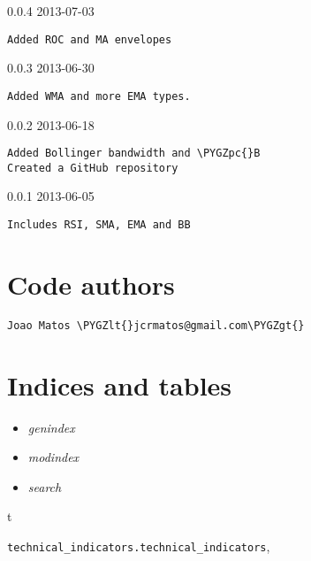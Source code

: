 \documentclass[letterpaper,10pt,english]{sphinxmanual}
\def\PYGZlt{\char`\<}
\def\PYGZgt{\char`\>}
\def\PYGZpc{\char`\%}
\begin{document}
0.0.4 2013-07-03

\begin{Verbatim}[commandchars=\\\{\}]
Added ROC and MA envelopes
\end{Verbatim}

0.0.3 2013-06-30

\begin{Verbatim}[commandchars=\\\{\}]
Added WMA and more EMA types.
\end{Verbatim}

0.0.2 2013-06-18

\begin{Verbatim}[commandchars=\\\{\}]
Added Bollinger bandwidth and \PYGZpc{}B
Created a GitHub repository
\end{Verbatim}

0.0.1 2013-06-05

\begin{Verbatim}[commandchars=\\\{\}]
Includes RSI, SMA, EMA and BB
\end{Verbatim}


\chapter{Code authors}
\label{codeauthors:code-authors}\label{codeauthors::doc}
\begin{Verbatim}[commandchars=\\\{\}]
Joao Matos \PYGZlt{}jcrmatos@gmail.com\PYGZgt{}
\end{Verbatim}


\chapter{Indices and tables}
\label{index:indices-and-tables}\begin{itemize}
\item {} 
\emph{genindex}

\item {} 
\emph{modindex}

\item {} 
\emph{search}

\end{itemize}


\renewcommand{\indexname}{Python Module Index}
\begin{theindex}
\def\bigletter#1{{\Large\sffamily#1}\nopagebreak\vspace{1mm}}
\bigletter{t}
\item {\texttt{technical\_indicators.technical\_indicators}}, \pageref{reference:module-technical_indicators.technical_indicators}
\end{theindex}

\renewcommand{\indexname}{Index}
\printindex
\end{document}

